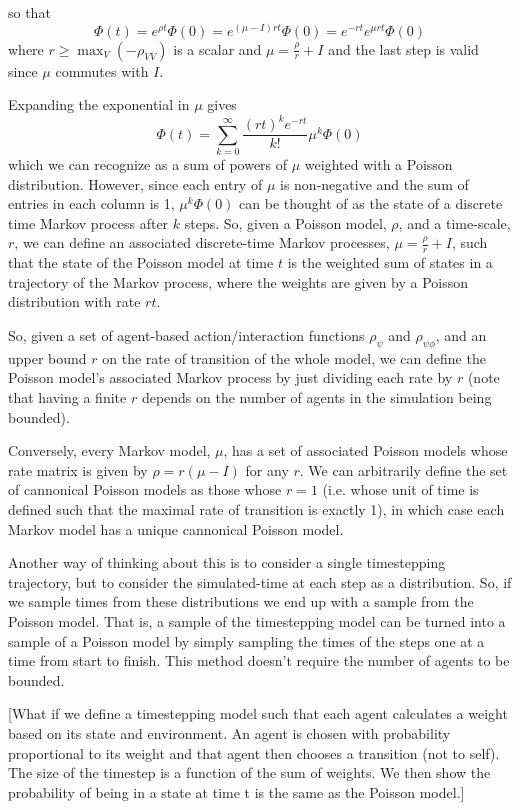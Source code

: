 \documentclass[a4paper]{article}
\begin{document}
so that
\[
\Phi(t) = e^{\rho t}\Phi(0) = e^{(\mu - I)rt}\Phi(0) = e^{-rt}e^{\mu rt}\Phi(0)
\]
where $r \ge \max_V(-\rho_{VV})$ is a scalar and $\mu = \frac{\rho}{r} + I$ and the last step is valid since $\mu$ commutes with $I$.

Expanding the exponential in $\mu$ gives
\[
\Phi(t)  = \sum_{k=0}^\infty \frac{ (rt)^k e^{-rt}}{k!}\mu^k\Phi(0)
\]
which we can recognize as a sum of powers of $\mu$ weighted with a Poisson distribution. However, since each entry of $\mu$ is non-negative and the sum of entries in each column is 1, $\mu^k \Phi(0)$ can be thought of as the state of a discrete time Markov process after $k$ steps. So, given a Poisson model, $\rho$, and a time-scale, $r$, we can define an associated discrete-time Markov processes, $\mu = \frac{\rho}{r} + I$, such that the state of the Poisson model at time $t$ is the weighted sum of states in a trajectory of the Markov process, where the weights are given by a Poisson distribution with rate $rt$. 

So, given a set of agent-based action/interaction functions $\rho_\psi$ and $\rho_{\psi\phi}$, and an upper bound $r$ on the rate of transition of the whole model, we can define the Poisson model's associated Markov process by just dividing each rate by $r$ (note that having a finite $r$ depends on the number of agents in the simulation being bounded).

Conversely, every Markov model, $\mu$, has a set of associated Poisson models whose rate matrix is given by $\rho = r(\mu-I)$ for any $r$. We can arbitrarily define the set of cannonical Poisson models as those whose $r=1$ (i.e. whose unit of time is defined such that the maximal rate of transition is exactly 1), in which case each Markov model has a unique cannonical Poisson model.

Another way of thinking about this is to consider a single timestepping trajectory, but to consider the simulated-time at each step as a distribution. So, if we sample times from these distributions we end up with a sample from the Poisson model. That is, a sample of the timestepping model can be turned into a sample of a Poisson model by simply sampling the times of the steps one at a time from start to finish. This method doesn't require the number of agents to be bounded.

[What if we define a timestepping model such that each agent calculates a weight based on its state and environment. An agent is chosen with probability proportional to its weight and that agent then chooses a transition (not to self). The size of the timestep is a function of the sum of weights. We then show the probability of being in a state at time t is the same as the Poisson model.]
\end{document}
